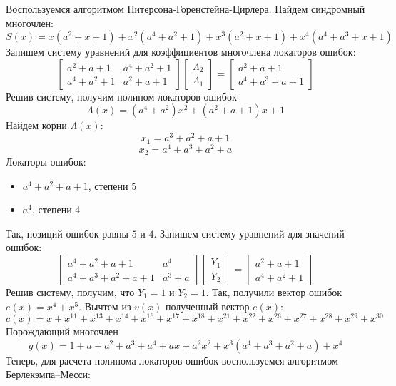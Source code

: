 \documentclass{article}
\begin{document}
Воспользуемся алгоритмом Питерсона-Горенстейна-Цирлера. Найдем синдромный многочлен:
$$S(x)=x(a^{2}+x+1)+x^{2}(a^{4}+a^{2}+1)+x^{3}(a^{2}+x+1)+x^{4}(a^{4}+a^{3}+x+1)$$
Запишем систему уравнений для коэффициентов многочлена локаторов ошибок:
$$\begin{bmatrix}
a^{2}+a+1 & a^{4}+a^{2}+1 \\
a^{4} + a^{2}+1 & a^{2}+a+1
\end{bmatrix} \begin{bmatrix}
\Lambda_{2} \\
\Lambda_{1}
\end{bmatrix}=
\begin{bmatrix}
a^{2}+a+1 \\
a^{4}+a^{3}+a+1
\end{bmatrix}$$
Решив систему, получим полином локаторов ошибок
$$\Lambda(x)=(a^{4}+a^{2})x^{2}+(a^{2}+a+1)x+1$$
Найдем корни $\Lambda(x)$:
$$x_{1}=a^{3}+a^{2}+a+1$$
$$x_{2}=a^{4}+a^{3}+a^{2}+a$$
Локаторы ошибок:
\begin{itemize}
    \item $a^{4}+a^{2}+a+1$, степени $5$
    \item $a^{4}$, степени $4$
\end{itemize}
Так, позиций ошибок равны $5$ и $4$.
Запишем систему уравнений для значений ошибок:
$$\begin{bmatrix}
a^{4}+a^{2}+a+1 & a^{4} \\
a^{4} + a^{3}+a^{2}+a+1 & a^{3}+a
\end{bmatrix} \begin{bmatrix}
Y_{1} \\
Y_{2}
\end{bmatrix}=
\begin{bmatrix}
a^{2}+a+1 \\
a^{4}+a^{2}+1
\end{bmatrix}$$
Решив систему, получим, что $Y_{1}=1$ и $Y_{2}=1$.
Так, получили вектор ошибок $e(x)=x^{4}+x^{5}$. Вычтем из $v(x)$ полученный вектор $e(x)$:
$$c(x)=x + x^{11} + x^{13} + x^{14} + x^{16} + x^{17} + x^{18} + x^{21} + x^{22} + x^{26} + x^{27} + x^{28} + x^{29} + x^{30}$$
Порождающий многочлен $$g(x)=1+a+a^{2}+a^{3}+a^{4}+ax+a^{2}x^{2}+x^{3}(a^{4}+a^{3}+a^{2}+a)+x^{4}$$
Теперь, для расчета полинома локаторов ошибок воспользуемся алгоритмом Берлекэмпа–Месси:
\end{document}
